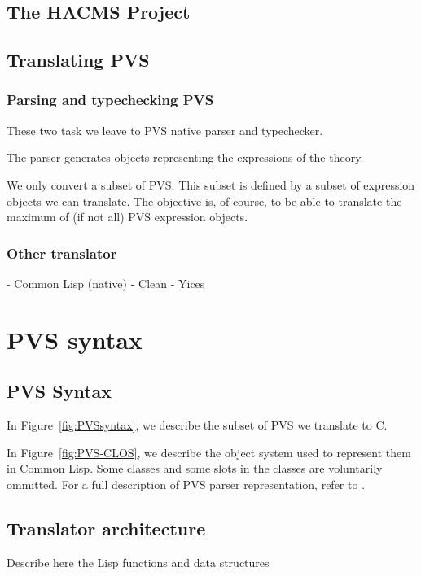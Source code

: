 \documentclass[12pt,a4paper,titlepage]{article}
\begin{document}
\subsection{The HACMS Project}


\subsection{Translating PVS}
\subsubsection{Parsing and typechecking PVS}
These two task we leave to PVS native parser and typechecker.

The parser generates objects representing the expressions of the theory.

We only convert a subset of PVS.
This subset is defined by a subset of expression objects we can translate.
The objective is, of course, to be able to translate the maximum of (if not all) PVS expression objects.

\subsubsection{Other translator}
- Common Lisp (native)
- Clean
- Yices




\section{PVS syntax}

\subsection{PVS Syntax}

In Figure~\ref{fig:PVSsyntax}, we describe the subset of PVS we translate to C.

In Figure~\ref{fig:PVS-CLOS}, we describe the object system used to represent them in Common Lisp. Some classes and some slots in the classes are voluntarily ommitted. For a full description of PVS parser representation, refer to \cite{PVS:api}.




\subsection{Translator architecture}

Describe here the Lisp functions and data structures
\end{document}
